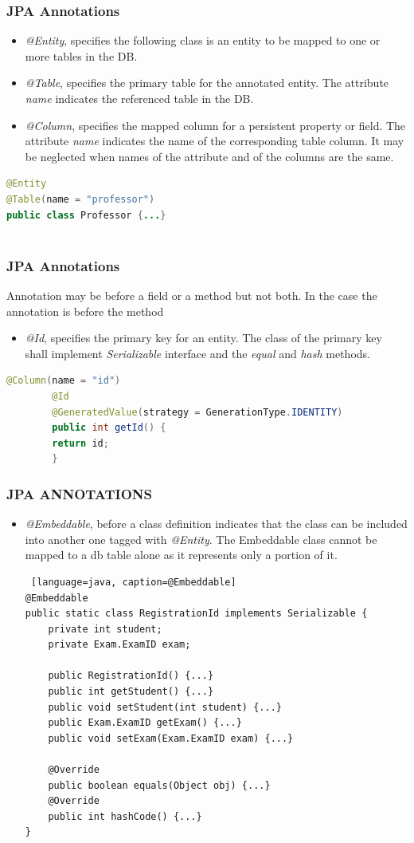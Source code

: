 \documentclass{beamer}
\begin{document}
\begin{frame} [fragile]
\frametitle{JPA Annotations}
\begin{itemize}
\item \textit{@Entity}, specifies the following class is an entity to be mapped to one or more tables in the DB.
\item \textit{@Table}, specifies the primary table for the annotated entity. The attribute \textit{name} indicates the referenced table in the DB.
\item \textit{@Column}, specifies the mapped column for a persistent property or field. The attribute \textit{name} indicates the name of the corresponding table column. It may be neglected when names of the attribute and of the columns are the same.
\end{itemize}
\begin{lstlisting}[language=Java, caption=@Entity and @Table]
@Entity
@Table(name = "professor")
public class Professor {...}
	
\end{lstlisting}
\end{frame}

\begin{frame}[fragile]
	\frametitle{JPA Annotations}
	Annotation may be before a field or a method but not both. In the case the annotation is before the method
	\begin{itemize}
		\item \textit{@Id}, specifies the primary key for an entity. The class of the primary key shall implement \textit{Serializable} interface and the \textit{equal} and \textit{hash} methods.
	\end{itemize}
	\begin{lstlisting}[language=java, caption=@Id @Column and @GeneratedValue]
		@Column(name = "id")
		@Id
		@GeneratedValue(strategy = GenerationType.IDENTITY)
		public int getId() {
		return id;
		}
	\end{lstlisting}
\end{frame}

\begin{frame} [fragile]
	\frametitle{JPA ANNOTATIONS}
	\begin{itemize}
		\item \textit{@Embeddable}, before a class definition indicates that the class can be included into another one tagged with \textit{@Entity}. The Embeddable class cannot be mapped to a db table alone as it represents only a portion of it.
		\begin{lstlisting} [language=java, caption=@Embeddable]
@Embeddable
public static class RegistrationId implements Serializable {
	private int student;
	private Exam.ExamID exam;
	
	public RegistrationId() {...}	
	public int getStudent() {...}
	public void setStudent(int student) {...}
	public Exam.ExamID getExam() {...}
	public void setExam(Exam.ExamID exam) {...}
		
	@Override
	public boolean equals(Object obj) {...}		
	@Override
	public int hashCode() {...}
}
		\end{lstlisting}
	\end{itemize}
\end{frame}
\end{document}
